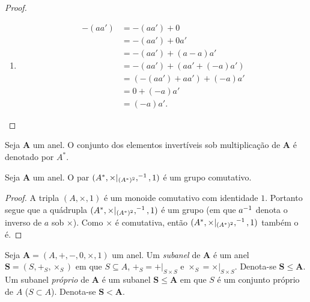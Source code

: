 \begin{proof}
\begin{enumerate}
	\item
		\begin{align*}
		-(a a') &= -(a a') + 0 \\
			&= -(a a') + 0 a' \\
			&= -(a a') + (a - a) a' \\
			&= -(a a') + (a a' + (-a) a') \\
			&= (-(a a') + a a') + (-a) a' \\
			&= 0 + (-a) a' \\
			&= (-a) a'.
		\end{align*}
	\end{enumerate}
\end{proof}

\begin{defi}
Seja $\bm A$ um anel. O conjunto dos elementos invertíveis sob multiplicação de $\bm A$ é denotado por $A^*$.
\end{defi}

\begin{prop}
Seja $\bm A$ um anel. O par $(A^*,\times|_{(A^*)^2},^{-1},1)$ é um grupo comutativo.
\end{prop}
\begin{proof}
A tripla $(A,\times,1)$ é um monoide comutativo com identidade $1$. Portanto segue que a quádrupla $(A^*,\times|_{(A^*)^2},^{-1},1)$ é um grupo (em que $a^{-1}$ denota o inverso de $a$ sob $\times$). Como $\times$ é comutativa, então $(A^*,\times|_{(A^*)^2},^{-1},1)$ também o é.
\end{proof}

\begin{defi}
Seja $\bm A=(A,+,-,0,\times,1)$ um anel. Um \emph{subanel} de $\bm A$ é um anel $\bm S=(S,+_S,\times_S)$ em que $S \subseteq A$, $+_S = +|_{S \times S}$ e $\times_S = \times|_{S \times S}$. Denota-se $\bm S \leq \bm A$. Um subanel \emph{próprio} de $\bm A$ é um subanel $\bm S \leq \bm A$ em que $S$ é um conjunto próprio de $A$ ($S \subset A$). Denota-se $\bm S < \bm A$.
\end{defi}

